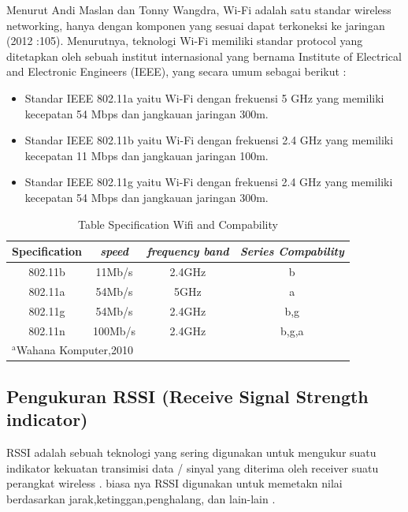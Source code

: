 \documentclass[conference]{IEEEtran}
\begin{document}
Menurut Andi Maslan dan Tonny Wangdra, Wi-Fi adalah
satu standar wireless networking, hanya dengan komponen yang sesuai dapat
terkoneksi ke jaringan (2012 :105). Menurutnya, teknologi Wi-Fi memiliki standar
protocol yang ditetapkan oleh sebuah institut internasional yang bernama Institute of
Electrical and Electronic Engineers (IEEE), yang secara umum sebagai berikut : 

\begin{itemize}
    \item Standar IEEE 802.11a yaitu Wi-Fi dengan frekuensi 5 GHz yang memiliki
    kecepatan 54 Mbps dan jangkauan jaringan 300m. 
    \item Standar IEEE 802.11b yaitu Wi-Fi dengan frekuensi 2.4 GHz yang memiliki
    kecepatan 11 Mbps dan jangkauan jaringan 100m. 
    \item Standar IEEE 802.11g yaitu Wi-Fi dengan frekuensi 2.4 GHz yang memiliki
    kecepatan 54 Mbps dan jangkauan jaringan 300m.
\end{itemize}

\begin{table}[htbp]
    \caption{Table Specification Wifi and Compability}
    \begin{center}
    \begin{tabular}{|c|c|c|c|}
        \hline
    \textbf{Specification} & \textbf{\textit{speed}}& \textbf{\textit{frequency band}}& \textbf{\textit{Series Compability}} \\
    \hline
    802.11b & 11Mb/s & 2.4GHz & b  \\
    \hline
    802.11a & 54Mb/s & 5GHz & a  \\
    \hline
    802.11g & 54Mb/s & 2.4GHz & b,g  \\
    \hline
    802.11n & 100Mb/s & 2.4GHz & b,g,a  \\
    \hline
    \multicolumn{4}{l}{$^{\mathrm{a}}$Wahana Komputer,2010}
    \end{tabular}
    \label{tab1}
    \end{center}
    \end{table}


\subsection{Pengukuran RSSI (Receive Signal Strength indicator)}
RSSI adalah sebuah teknologi yang sering digunakan untuk mengukur suatu indikator kekuatan transimisi
data / sinyal yang diterima oleh receiver suatu perangkat wireless . biasa nya RSSI digunakan untuk memetakn
nilai berdasarkan jarak,ketinggan,penghalang, dan lain-lain . 
\end{document}
